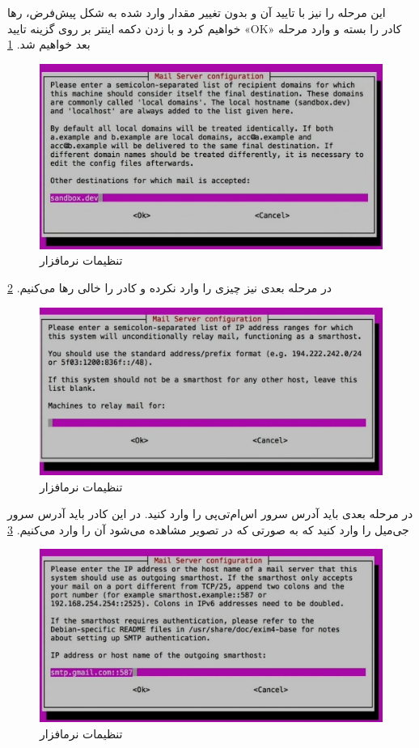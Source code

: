 این مرحله را نیز با تایید آن و بدون تغییر مقدار وارد شده به شکل پیش‌فرض، رها خواهیم کرد و با زدن دکمه اینتر بر روی گزینه تایید «OK» کادر را بسته و  وارد مرحله بعد خواهیم شد. \ref{MAIL-SERVER-EXIM5}

\begin{figure}
    \includegraphics[width=.9\textwidth ,height=.45\textwidth]{Pic/EXIM5}
    \caption{ تنظیمات نرمافزار 
    }
    \label{MAIL-SERVER-EXIM5}
\end{figure}
در مرحله بعدی نیز چیزی را وارد نکرده و کادر را خالی رها می‌کنیم.
\ref{MAIL-SERVER-EXIM6}
\begin{figure}
    \includegraphics[width=.9\textwidth ,height=.45\textwidth]{Pic/EXIM6}
    \caption{ تنظیمات نرمافزار 
    }
    \label{MAIL-SERVER-EXIM6}
\end{figure}
در مرحله بعدی باید آدرس سرور اس‌ام‌تی‌پی را وارد کنید. در این کادر باید آدرس سرور جی‌میل را وارد کنید که به صورتی که در تصویر مشاهده می‌شود آن را وارد می‌کنیم.
\ref{MAIL-SERVER-EXIM7}
\begin{figure}
    \includegraphics[width=.9\textwidth ,height=.45\textwidth]{Pic/EXIM7}
    \caption{ تنظیمات نرمافزار 
    }
    \label{MAIL-SERVER-EXIM7}
\end{figure}
